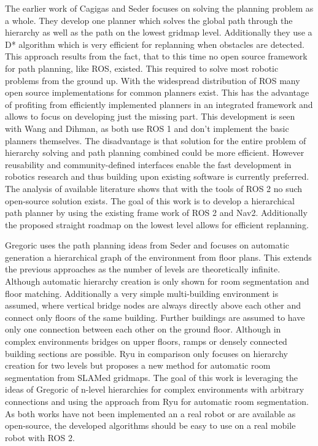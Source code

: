 The earlier work of Cagigas and Seder focuses on solving the planning problem as a whole. They develop one planner which solves the global path through the hierarchy as well as the path on the lowest gridmap level. Additionally they use a D* algorithm which is very efficient for replanning when obstacles are detected. This approach results from the fact, that to this time no open source framework for path planning, like ROS, existed. This required to solve most robotic problems from the ground up. With the widespread distribution of ROS many open source implementations for common planners exist. This has the advantage of profiting from efficiently implemented planners in an integrated framework and allows to focus on developing just the missing part. This development is seen with Wang and Dihman, as both use ROS 1 and don't implement the basic planners themselves. The disadvantage is that solution for the entire problem of hierarchy solving and path planning combined could be more efficient. However reusability and community-defined interfaces enable the fast development in robotics research and thus building upon existing software is currently preferred. The analysis of available literature shows that with the tools of ROS 2 no such open-source solution exists. The goal of this work is to develop a hierarchical path planner by using the existing frame work of ROS 2 and Nav2. Additionally the proposed straight roadmap on the lowest level allows for efficient replanning.

Gregoric uses the path planning ideas from Seder and focuses on automatic generation a hierarchical graph of the environment from floor plans. This extends the previous approaches as the number of levels are theoretically infinite. Although automatic hierarchy creation is only shown for room segmentation and floor matching. Additionally a very simple multi-building environment is assumed, where vertical bridge nodes are always directly above each other and connect only floors of the same building. Further buildings are assumed to have only one connection between each other on the ground floor. Although in complex environments bridges on upper floors, ramps or densely connected building sections are possible. Ryu in comparison only focuses on hierarchy creation for two levels but proposes a new method for automatic room segmentation from SLAMed gridmaps. The goal of this work is leveraging the ideas of Gregoric of n-level hierarchies for complex environments with arbitrary connections and using the approach from Ryu for automatic room segmentation. As both works have not been implemented an a real robot or are available as open-source, the developed algorithms should be easy to use on a real mobile robot with ROS 2.

